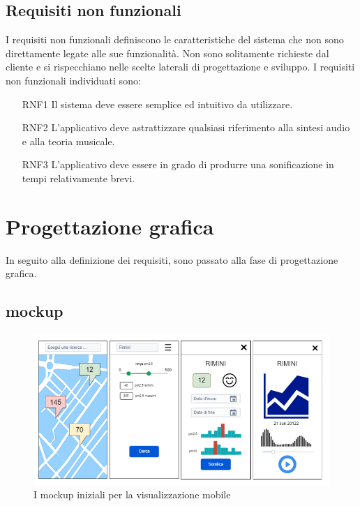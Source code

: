\subsection{Requisiti non funzionali}
I requisiti non funzionali definiscono le caratteristiche del sistema che non sono direttamente legate alle sue funzionalità.
Non sono solitamente richieste dal cliente e si rispecchiano nelle scelte laterali di progettazione e sviluppo.
I requisiti non funzionali individuati sono:
\begin{itemize}
    \item[RNF1] Il sistema deve essere semplice ed intuitivo da utilizzare.
    \item[RNF2] L'applicativo deve astrattizzare qualsiasi riferimento alla sintesi audio e alla teoria musicale.
    \item[RNF3] L'applicativo deve essere in grado di produrre una sonificazione in tempi relativamente brevi.  
\end{itemize}



\section{Progettazione grafica}
In seguito alla definizione dei requisiti, sono passato alla fase di progettazione grafica.
\subsection{mockup}

\begin{figure}[h]
    \includegraphics[width=\linewidth]{img/mockup.png}
    \caption{I mockup iniziali per la visualizzazione mobile}
    \label{fig:mockup}
\end{figure}

